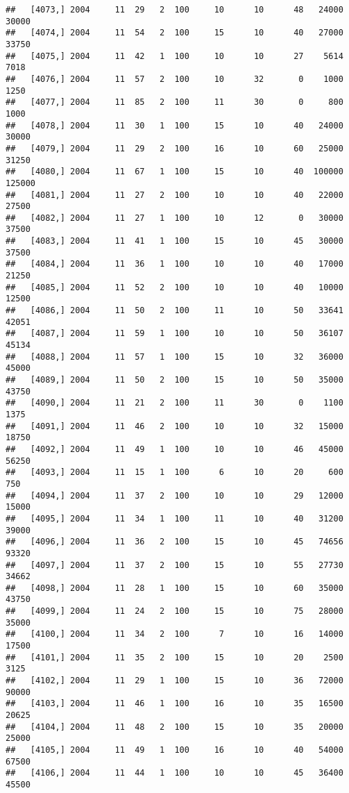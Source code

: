 \documentclass{article}\usepackage[]{graphicx}\usepackage[]{color}
\makeatletter
\newenvironment{kframe}{%
 \def\at@end@of@kframe{}%
 \ifinner\ifhmode%
  \def\at@end@of@kframe{\end{minipage}}%
  \begin{minipage}{\columnwidth}%
 \fi\fi%
 \def\FrameCommand##1{\hskip\@totalleftmargin \hskip-\fboxsep
 \colorbox{shadecolor}{##1}\hskip-\fboxsep
     \hskip-\linewidth \hskip-\@totalleftmargin \hskip\columnwidth}%
 \MakeFramed {\advance\hsize-\width
   \@totalleftmargin\z@ \linewidth\hsize
   \@setminipage}}%
 {\par\unskip\endMakeFramed%
 \at@end@of@kframe}
\newenvironment{knitrout}{}{} %
\makeatother
\begin{document}
\begin{knitrout}
\begin{kframe}
\begin{verbatim}
##   [4073,] 2004     11  29   2  100     10      10      48   24000   30000
##   [4074,] 2004     11  54   2  100     15      10      40   27000   33750
##   [4075,] 2004     11  42   1  100     10      10      27    5614    7018
##   [4076,] 2004     11  57   2  100     10      32       0    1000    1250
##   [4077,] 2004     11  85   2  100     11      30       0     800    1000
##   [4078,] 2004     11  30   1  100     15      10      40   24000   30000
##   [4079,] 2004     11  29   2  100     16      10      60   25000   31250
##   [4080,] 2004     11  67   1  100     15      10      40  100000  125000
##   [4081,] 2004     11  27   2  100     10      10      40   22000   27500
##   [4082,] 2004     11  27   1  100     10      12       0   30000   37500
##   [4083,] 2004     11  41   1  100     15      10      45   30000   37500
##   [4084,] 2004     11  36   1  100     10      10      40   17000   21250
##   [4085,] 2004     11  52   2  100     10      10      40   10000   12500
##   [4086,] 2004     11  50   2  100     11      10      50   33641   42051
##   [4087,] 2004     11  59   1  100     10      10      50   36107   45134
##   [4088,] 2004     11  57   1  100     15      10      32   36000   45000
##   [4089,] 2004     11  50   2  100     15      10      50   35000   43750
##   [4090,] 2004     11  21   2  100     11      30       0    1100    1375
##   [4091,] 2004     11  46   2  100     10      10      32   15000   18750
##   [4092,] 2004     11  49   1  100     10      10      46   45000   56250
##   [4093,] 2004     11  15   1  100      6      10      20     600     750
##   [4094,] 2004     11  37   2  100     10      10      29   12000   15000
##   [4095,] 2004     11  34   1  100     11      10      40   31200   39000
##   [4096,] 2004     11  36   2  100     15      10      45   74656   93320
##   [4097,] 2004     11  37   2  100     15      10      55   27730   34662
##   [4098,] 2004     11  28   1  100     15      10      60   35000   43750
##   [4099,] 2004     11  24   2  100     15      10      75   28000   35000
##   [4100,] 2004     11  34   2  100      7      10      16   14000   17500
##   [4101,] 2004     11  35   2  100     15      10      20    2500    3125
##   [4102,] 2004     11  29   1  100     15      10      36   72000   90000
##   [4103,] 2004     11  46   1  100     16      10      35   16500   20625
##   [4104,] 2004     11  48   2  100     15      10      35   20000   25000
##   [4105,] 2004     11  49   1  100     16      10      40   54000   67500
##   [4106,] 2004     11  44   1  100     10      10      45   36400   45500

\end{verbatim}
\end{kframe}
\end{knitrout}
\end{document}
